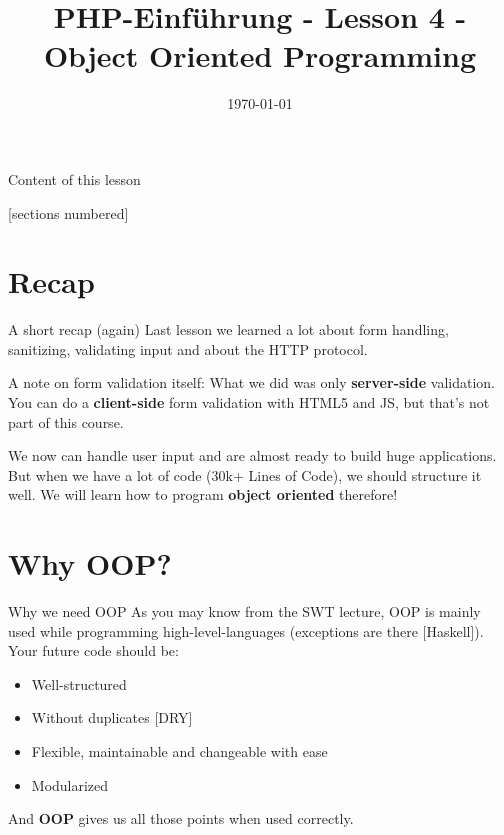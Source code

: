 


\newcommand{\topic}{
	PHP-Einführung - Lesson 4 - Object Oriented Programming
}

\title{\topic}
\date{\today}



\maketitle

\begin{frame}{Content of this lesson}

	[sections numbered]
	\tableofcontents

\end{frame}

\section{Recap}

\begin{frame}{A short recap (again)}
	Last lesson we learned a lot about form handling, sanitizing, validating input and about the HTTP protocol. \pause

	A note on form validation itself: What we did was only \textbf{server-side} validation. You can do a \textbf{client-side} form validation with HTML5 and JS, but that's not part of this course.	\pause
	
	We now can handle user input and are almost ready to build huge applications. But when we have a lot of code (30k+ Lines of Code), we should structure it well. We will learn how to program \textbf{object oriented} therefore!
\end{frame}

\section{Why OOP?}

\begin{frame}{Why we need OOP}
	As you may know from the SWT lecture, OOP is mainly used while programming high-level-languages (exceptions are there [Haskell]). Your future code should be:\pause
	\begin{itemize}
	\item Well-structured \pause
	\item Without duplicates [DRY] \pause
	\item Flexible, maintainable and changeable with ease \pause
	\item Modularized \pause
	\end{itemize}
	
And \textbf{OOP} gives us all those points when used correctly.
\end{frame}

